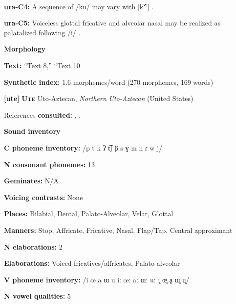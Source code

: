 \textbf{ura-C4:} A sequence of /ku/ may vary with [k\textsuperscript{w}] \citep[37]{Olawsky2006}.



\textbf{ura-C5:} Voiceless glottal fricative and alveolar nasal may be realized as palatalized following /i/ \citep[47]{Olawsky2006}.



\textbf{Morphology}



\textbf{Text:} “Text 8,” “Text 10 \citep[902-905]{Olawsky2006}



\textbf{Synthetic index:} 1.6 morphemes/word (270 morphemes, 169 words)



\textbf{[ute]}   \textbf{\textsc{Ute}  }  Uto-Aztecan, \textit{Northern} \textit{Uto-Aztecan} (United States)



References \textbf{consulted:} \citet{Givón2011}, \citet{Harms1966}, \citet{Oberly2013}



\textbf{Sound inventory}



\textbf{C phoneme inventory:} /p t k ʔ t͡ʃ β s ɣ m n ɾ w j/



\textbf{N consonant phonemes:} 13



\textbf{Geminates:} N/A



\textbf{Voicing contrasts:} None



\textbf{Places:} Bilabial, Dental, Palato-Alveolar, Velar, Glottal



\textbf{Manners:} Stop, Affricate, Fricative, Nasal, Flap/Tap, Central approximant



\textbf{N elaborations:} 2



\textbf{Elaborations:} Voiced fricatives/affricates, Palato-alveolar



\textbf{V phoneme inventory:} /i œ a ɯ u iː œː aː ɯː uː i̥ œ̥ ḁ ɯ̥ u̥/



\textbf{N vowel qualities:} 5



